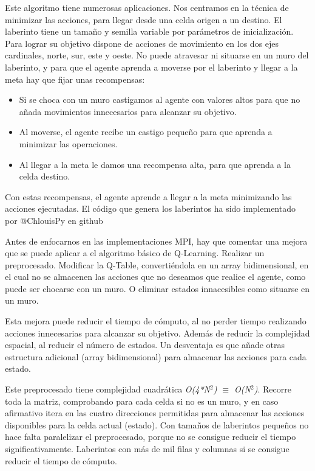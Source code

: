 		Este algoritmo tiene numerosas aplicaciones. Nos centramos en la técnica de minimizar las acciones, para llegar desde una celda origen a un destino. El laberinto tiene un tamaño y semilla variable por parámetros de inicialización. Para lograr su objetivo dispone de acciones de movimiento en los dos ejes cardinales, norte, sur, este y oeste. No puede atravesar ni situarse en un muro del laberinto, y para que el agente aprenda a moverse por el laberinto y llegar a la meta hay que fijar unas recompensas:
		\begin{itemize}
			\item Si se choca con un muro castigamos al agente con valores altos para que no añada movimientos innecesarios para alcanzar su objetivo.
			\vspace*{-0.2cm}
			\item Al moverse, el agente recibe un castigo pequeño para que aprenda a minimizar las operaciones.
			\vspace*{-0.2cm}
			\item Al llegar a la meta le damos una recompensa alta, para que aprenda a la celda destino. 		
			\vspace*{-0.2cm}
		\end{itemize}
	
		Con estas recompensas, el agente aprende a llegar a la meta minimizando las acciones ejecutadas. El código que genera los laberintos ha sido implementado por @ChlouisPy en github\cite{MazeGenerator}


		Antes de enfocarnos en las implementaciones MPI, hay que comentar una mejora que se puede aplicar a el algoritmo básico de Q-Learning. Realizar un preprocesado. Modificar la Q-Table, convertiéndola en un array bidimensional, en el cual no se almacenen las acciones que no deseamos que realice el agente, como puede ser chocarse con un muro. O eliminar estados innacesibles como situarse en un muro.
		
		Esta mejora puede reducir el tiempo de cómputo, al no perder tiempo realizando acciones innecesarias para alcanzar su objetivo. Además de reducir la complejidad espacial, al reducir el número de estados. Un desventaja es que añade otras estructura adicional (array bidimensional) para almacenar las acciones para cada estado. 
		
		Este preprocesado tiene complejidad cuadrática \textit{O(4*N\(^{2}\)) $\equiv$ O(N\(^{2}\))}. Recorre toda la matriz, comprobando para cada celda si no es un muro, y en caso afirmativo itera en las cuatro direcciones permitidas para almacenar las acciones disponibles para la celda actual (estado). Con tamaños de laberintos pequeños no hace falta paralelizar el preprocesado, porque no se consigue reducir el tiempo significativamente. Laberintos con más de mil filas y columnas si se consigue reducir el tiempo de cómputo.
		
